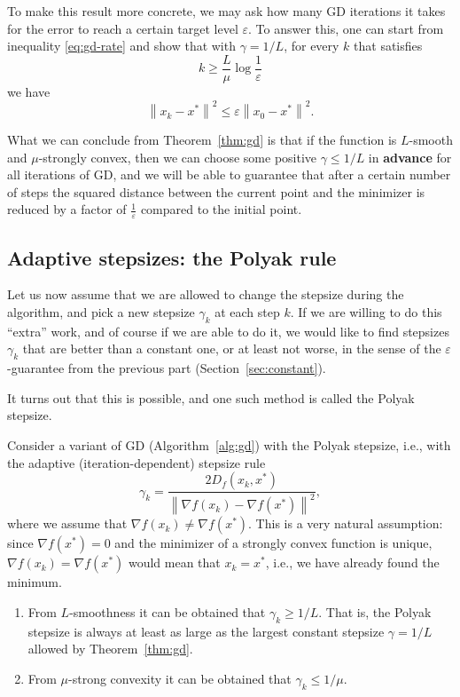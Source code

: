 \documentclass[11pt]{article}
\newcommand{\norm}[1]{\left\| #1 \right\|}
\begin{document}
To make this result more concrete,
we may ask how many GD iterations it takes for the error to reach
a certain target level $\varepsilon$. To answer this, one can start from inequality
\eqref{eq:gd-rate} and show that with $\gamma = 1/L$, for every $k$ that satisfies
\begin{equation}\label{eq:gd-iter}
k \geq \frac{L}{\mu}\log\frac{1}{\varepsilon}
\end{equation}
we have
\[
\norm{x_k-x^*}^2 \leq \varepsilon\norm{x_0-x^*}^2.
\]

What we can conclude from Theorem~\ref{thm:gd} is that if the function is $L$-smooth and
$\mu$-strongly convex, then we can choose some positive $\gamma \leq 1/L$ in \textbf{advance}
for all iterations of GD, and we will be able to guarantee that after a certain number of steps
the squared distance between the current point and the minimizer is reduced by a factor
of $\frac{1}{\varepsilon}$ compared to the initial point.

\subsection{Adaptive stepsizes: the Polyak rule}\label{sec:polyak-rule}

Let us now assume that we are allowed to change the stepsize during the algorithm,
and pick a new stepsize $\gamma_k$ at each step $k$.
If we are willing to do this ``extra'' work, and of course if we are able to do it,
we would like to find stepsizes $\gamma_k$ that are better than a constant one, or at least not worse,
in the sense of the $\varepsilon$-guarantee from the previous part (Section~\ref{sec:constant}).

It turns out that this is possible, and one such method is called the Polyak stepsize.

Consider a variant of GD (Algorithm~\ref{alg:gd}) with the Polyak stepsize, i.e., with the adaptive
(iteration-dependent) stepsize rule
\begin{equation}\label{eq:polyak}
\gamma_k = \frac{2D_f(x_k,x^*)}{\norm{\nabla f(x_k) - \nabla f(x^*)}^2},
\end{equation}
where we assume that $\nabla f(x_k) \neq \nabla f(x^*)$. This is a very natural assumption:
since $\nabla f(x^*) = 0$ and the minimizer of a strongly convex function is unique,
$\nabla f(x_k) = \nabla f(x^*)$ would mean that $x_k = x^*$, i.e., we have already found the minimum.

\begin{enumerate}
  \renewcommand{\theenumi}{(\roman{enumi})}
  \renewcommand{\labelenumi}{\theenumi}
  \item\label{it:lower} From $L$-smoothness it can be obtained that $\gamma_k \geq 1/L$. That is,
  the Polyak stepsize is always at least as large as the largest constant stepsize
  $\gamma = 1/L$ allowed by Theorem~\ref{thm:gd}.
  \item\label{it:upper} From $\mu$-strong convexity it can be obtained that $\gamma_k \leq 1/\mu$.
\end{enumerate}
\end{document}
